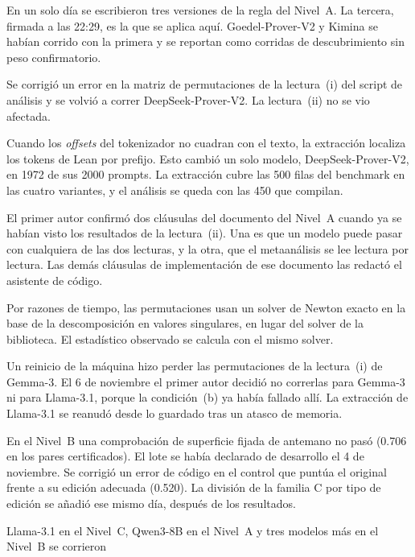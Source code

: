 \documentclass[10pt]{article}
\begin{document}
\begin{description}[leftmargin=1.2em]
\item[4 nov] En un solo día se escribieron tres versiones de la regla del Nivel~A. La tercera, firmada a las 22:29,
es la que se aplica aquí. Goedel-Prover-V2 y Kimina se habían corrido con la primera y se reportan como corridas de descubrimiento sin peso confirmatorio.
\item[5 nov, 08:37] Se corrigió un error en la matriz de permutaciones de la lectura~(i) del script de análisis y
se volvió a correr DeepSeek-Prover-V2. La lectura~(ii) no se vio afectada.
\item[5 nov] Cuando los \emph{offsets} del tokenizador no cuadran con el texto, la extracción localiza los tokens
de Lean por prefijo. Esto cambió un solo modelo, DeepSeek-Prover-V2, en 1972 de sus 2000 prompts.
La extracción cubre las 500 filas del benchmark en las cuatro variantes, y el análisis se queda con las 450 que
compilan.
\item[5 nov] El primer autor confirmó dos cláusulas del documento del Nivel~A cuando ya se habían visto los
resultados de la lectura~(ii). Una es que un modelo puede pasar con cualquiera de las dos lecturas, y la otra, que
el metaanálisis se lee lectura por lectura. Las demás cláusulas de implementación de ese documento las redactó el
asistente de código.
\item[5 nov] Por razones de tiempo, las permutaciones usan un solver de Newton exacto en la base de la
descomposición en valores singulares, en lugar del solver de la biblioteca. El estadístico observado se calcula con
el mismo solver.
\item[5--6 nov] Un reinicio de la máquina hizo perder las permutaciones de la lectura~(i) de Gemma-3. El 6 de
noviembre el primer autor decidió no correrlas para Gemma-3 ni para Llama-3.1, porque la condición~(b) ya había
fallado allí. La extracción de Llama-3.1 se reanudó desde lo guardado tras un atasco de memoria.
\item[6 nov] En el Nivel~B una comprobación de superficie fijada de antemano no pasó (0.706 en los pares certificados). El lote se había declarado de desarrollo el 4 de noviembre. Se corrigió un error de código en el control que puntúa el
original frente a su edición adecuada (0.520). La división de la familia C por tipo de edición se añadió ese mismo
día, después de los resultados.
\item[7--8 nov] Llama-3.1 en el Nivel~C, Qwen3-8B en el Nivel~A y tres modelos más en el Nivel~B se corrieron

\end{description}
\end{document}
